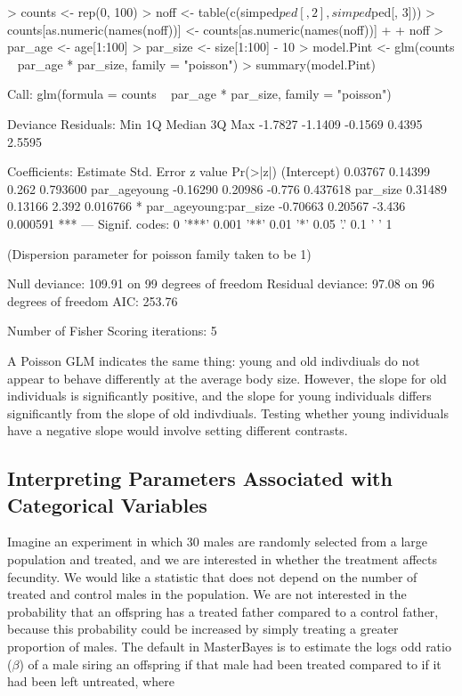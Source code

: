 \documentclass{article}
\begin{document}
\begin{Schunk}
\begin{Sinput}
> counts <- rep(0, 100)
> noff <- table(c(simped$ped[, 2], simped$ped[, 3]))
> counts[as.numeric(names(noff))] <- counts[as.numeric(names(noff))] + 
+     noff
> par_age <- age[1:100]
> par_size <- size[1:100] - 10
> model.Pint <- glm(counts ~ par_age * par_size, family = "poisson")
> summary(model.Pint)
\end{Sinput}
\begin{Soutput}
Call:
glm(formula = counts ~ par_age * par_size, family = "poisson")

Deviance Residuals: 
    Min       1Q   Median       3Q      Max  
-1.7827  -1.1409  -0.1569   0.4395   2.5595  

Coefficients:
                      Estimate Std. Error z value Pr(>|z|)    
(Intercept)            0.03767    0.14399   0.262 0.793600    
par_ageyoung          -0.16290    0.20986  -0.776 0.437618    
par_size               0.31489    0.13166   2.392 0.016766 *  
par_ageyoung:par_size -0.70663    0.20567  -3.436 0.000591 ***
---
Signif. codes:  0 '***' 0.001 '**' 0.01 '*' 0.05 '.' 0.1 ' ' 1 

(Dispersion parameter for poisson family taken to be 1)

    Null deviance: 109.91  on 99  degrees of freedom
Residual deviance:  97.08  on 96  degrees of freedom
AIC: 253.76

Number of Fisher Scoring iterations: 5
\end{Soutput}
\end{Schunk}

A Poisson GLM indicates the same thing: young and old indivdiuals do not appear to behave differently at the average body size.  However, the slope for old individuals is significantly positive, and the slope for young individuals differs significantly from the slope of old indivdiuals. Testing whether young individuals have a negative slope would involve setting different contrasts. 

\subsection{Interpreting Parameters Associated with Categorical Variables}

Imagine an experiment in which 30 males are randomly selected from a large population and treated, and we are interested in whether the treatment affects fecundity.  We would like a statistic that does not depend on the number of treated and control males in the population.  We are not interested in the probability that an offspring has a treated father compared to a control father, because this probability could be increased by simply treating a greater proportion of males.  The default in MasterBayes is to estimate the logs odd ratio ($\beta$) of a male siring an offspring if that male had been treated compared to if it had been left untreated, where
\end{document}
